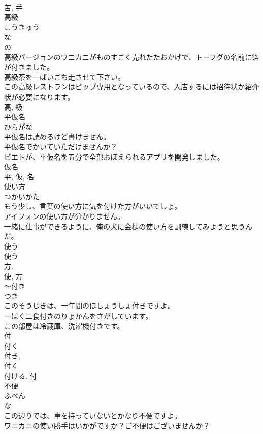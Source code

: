 \documentclass[8pt]{extreport}
\begin{document}
\begin{CJK}{UTF8}{min}
\\	苦, 手	
\\	高級	
\\	こうきゅう	
\\	な 
\\	の 
\\	高級バージョンのワニカニがものすごく売れたたおかげで、トーフグの名前に箔が付きました。	
\\	高級茶を一ぱいごち走させて下さい。	
\\	この高級レストランはビップ専用となっているので、入店するには招待状か紹介状が必要になります。	
\\	高, 級	
\\	平仮名	
\\	ひらがな	
\\	平仮名は読めるけど書けません。	
\\	平仮名でかいていただけませんか？	
\\	ビエトが、平仮名を五分で全部おぼえられるアプリを開発しました。	
\\	仮名 
\\	平, 仮, 名	
\\	使い方	
\\	つかいかた	
\\	もう少し、言葉の使い方に気を付けた方がいいでしょ。	
\\	アイフォンの使い方が分かりません。	
\\	一緒に仕事ができるように、俺の犬に金槌の使い方を訓練してみようと思うんだ。	
\\	使う 
\\	使う 
\\	方. 
\\	使, 方	
\\	〜付き	
\\	つき	
\\	このそうじきは、一年間のほしょうしょ付きですよ。	
\\	一ぱく二食付きのりょかんをさがしています。	
\\	この部屋は冷蔵庫、洗濯機付きです。	
\\	付 
\\	付く 
\\	付き, 
\\	付く 
\\	付ける.	付	
\\	不便	
\\	ふべん	
\\	な 
\\	この辺りでは、車を持っていないとかなり不便ですよ。	
\\	ワニカニの使い勝手はいかがですか？ご不便はございませんか？	

\end{CJK}
\end{document}
